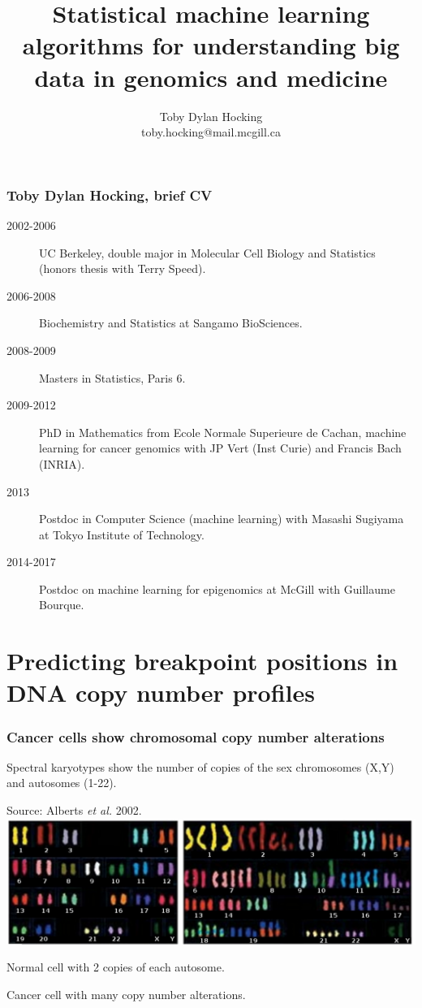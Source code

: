 \documentclass{beamer}
\begin{document}
\title{Statistical machine 
learning algorithms for 
understanding big data in
  genomics and medicine}

\author{
  Toby Dylan Hocking\\
  toby.hocking@mail.mcgill.ca
}

\maketitle

\begin{frame}
  \frametitle{Toby Dylan Hocking, brief CV}
  \begin{description}
  \item[2002-2006] UC Berkeley, double major in Molecular Cell Biology
    and Statistics (honors thesis with Terry Speed).
  \item[2006-2008] Biochemistry and Statistics at Sangamo BioSciences.
  \item[2008-2009] Masters in Statistics, Paris 6.
  \item[2009-2012] PhD in Mathematics from Ecole Normale Superieure de
    Cachan, machine learning for cancer genomics with JP Vert (Inst Curie)
    and Francis Bach (INRIA).
  \item[2013] Postdoc in Computer Science (machine learning) with Masashi Sugiyama at Tokyo
    Institute of Technology.
  \item[2014-2017] Postdoc on machine learning for epigenomics
    at McGill with Guillaume Bourque.
  \end{description}
\end{frame}
 
\section{Predicting breakpoint positions in DNA copy number profiles}

\begin{frame}
  \frametitle{Cancer cells show chromosomal copy number alterations}
  Spectral karyotypes show the number of copies of the sex chromosomes
  (X,Y) and autosomes (1-22). 

  Source: Alberts \emph{et al.} 2002.
\vskip 0.1in
  \includegraphics[width=\textwidth]{Karyo-both}
\vskip 0.1in
  \begin{minipage}{0.4\linewidth}
    Normal cell with 2 copies of each autosome.
  \end{minipage}
\linewidth
  \begin{minipage}{0.4\linewidth}
Cancer cell with many copy number alterations.
  \end{minipage}
\end{frame}
\end{document}
